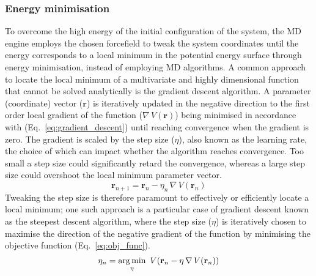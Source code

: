 \subsubsection{Energy minimisation}
To overcome the high energy of the initial configuration of the system, the MD engine employs the chosen forcefield to tweak the system coordinates until the energy corresponds to a local minimum in the potential energy surface through energy minimisation, instead of employing MD algorithms. A common approach to locate the local minimum of a multivariate and highly dimensional function that cannot be solved analytically is the gradient descent algorithm. A parameter (coordinate) vector ($\mathbf{r}$) is iteratively updated in the negative direction to the first order local gradient of the function ($\nabla \,V(\mathbf{r})$) being minimised in accordance with (Eq.~\ref{eq:gradient_descent}) until reaching convergence when the gradient is zero. The gradient is scaled by the step size ($\eta$), also known as the learning rate, the choice of which can impact whether the algorithm reaches convergence. Too small a step size could significantly retard the convergence, whereas a large step size could overshoot the local minimum parameter vector. 
%
\begin{equation} \label{eq:gradient_descent}
    \mathbf{r}_{n+1} = \mathbf{r}_{n} - \eta_{n} \, \nabla \, V(\mathbf{r}_{n})
\end{equation}
%
Tweaking the step size is therefore paramount to effectively or efficiently locate a local minimum; one such approach is a particular case of gradient descent known as the steepest descent algorithm, where the step size ($\eta$) is iteratively chosen to maximise the direction of the negative gradient of the function by minimising the objective function (Eq.~\ref{eq:obj_func}).\cite{Curry1944} 
%
\begin{equation} \label{eq:obj_func}
    \eta_n = \operatorname*{arg\,min}_{\eta} \, \, V ( \mathbf{r}_{n} - \eta \, \nabla \, V(\mathbf{r}_{n})) 
\end{equation}
%
